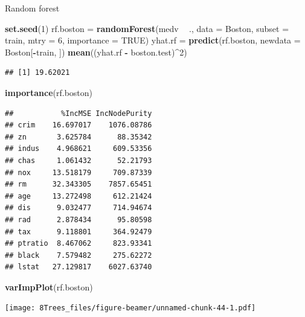 \documentclass[10pt,ignorenonframetext,]{beamer}
\newenvironment{Shaded}{\begin{snugshade}}{\end{snugshade}}
\newcommand{\KeywordTok}[1]{\textcolor[rgb]{0.13,0.29,0.53}{\textbf{#1}}}
\newcommand{\DataTypeTok}[1]{\textcolor[rgb]{0.13,0.29,0.53}{#1}}
\newcommand{\DecValTok}[1]{\textcolor[rgb]{0.00,0.00,0.81}{#1}}
\newcommand{\StringTok}[1]{\textcolor[rgb]{0.31,0.60,0.02}{#1}}
\newcommand{\OtherTok}[1]{\textcolor[rgb]{0.56,0.35,0.01}{#1}}
\newcommand{\OperatorTok}[1]{\textcolor[rgb]{0.81,0.36,0.00}{\textbf{#1}}}
\newcommand{\NormalTok}[1]{#1}
\begin{document}
\begin{frame}[fragile]

\begin{block}{Random forest}

\begin{Shaded}
\begin{Highlighting}[]
\KeywordTok{set.seed}\NormalTok{(}\DecValTok{1}\NormalTok{)}
\NormalTok{rf.boston =}\StringTok{ }\KeywordTok{randomForest}\NormalTok{(medv }\OperatorTok{~}\StringTok{ }\NormalTok{., }\DataTypeTok{data =}\NormalTok{ Boston, }\DataTypeTok{subset =}\NormalTok{ train, }\DataTypeTok{mtry =} \DecValTok{6}\NormalTok{, }
    \DataTypeTok{importance =} \OtherTok{TRUE}\NormalTok{)}
\NormalTok{yhat.rf =}\StringTok{ }\KeywordTok{predict}\NormalTok{(rf.boston, }\DataTypeTok{newdata =}\NormalTok{ Boston[}\OperatorTok{-}\NormalTok{train, ])}
\KeywordTok{mean}\NormalTok{((yhat.rf }\OperatorTok{-}\StringTok{ }\NormalTok{boston.test)}\OperatorTok{^}\DecValTok{2}\NormalTok{)}
\end{Highlighting}
\end{Shaded}

\begin{verbatim}
## [1] 19.62021
\end{verbatim}

\begin{Shaded}
\begin{Highlighting}[]
\KeywordTok{importance}\NormalTok{(rf.boston)}
\end{Highlighting}
\end{Shaded}

\begin{verbatim}
##           %IncMSE IncNodePurity
## crim    16.697017    1076.08786
## zn       3.625784      88.35342
## indus    4.968621     609.53356
## chas     1.061432      52.21793
## nox     13.518179     709.87339
## rm      32.343305    7857.65451
## age     13.272498     612.21424
## dis      9.032477     714.94674
## rad      2.878434      95.80598
## tax      9.118801     364.92479
## ptratio  8.467062     823.93341
## black    7.579482     275.62272
## lstat   27.129817    6027.63740
\end{verbatim}

\begin{Shaded}
\begin{Highlighting}[]
\KeywordTok{varImpPlot}\NormalTok{(rf.boston)}
\end{Highlighting}
\end{Shaded}

\texttt{[image: 8Trees\_files/figure-beamer/unnamed-chunk-44-1.pdf]}

\end{block}

\end{frame}
\end{document}
